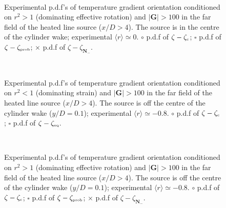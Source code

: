 \documentclass[doublespacing]{elsart}
\begin{document}
\newpage

\begin{figure}[htpb]
\begin{center}
\\
\caption{\label{fig8}
Experimental
p.d.f's of temperature gradient orientation
conditioned on $ r^2 > 1 $ (dominating effective rotation)
and $ |\bm{G}| > 100 $ in the far field of
the heated line source ($ x/D > 4 $).
The
source is in the centre of the cylinder wake;
experimental $ \langle r \rangle \simeq 0 $.
$ \circ $ p.d.f of $ \zeta - \zeta_{\mbox{\tiny c}} $;
$ \square $ p.d.f of $ \zeta - \zeta_{\mbox{\tiny prob}} $;
$ \times $ p.d.f of $ \zeta - \zeta_{\bm{N}_-} $.} 
\end{center}
\end{figure}

\newpage

\begin{figure}[htpb]
\begin{center}
\\
\caption{\label{fig9}
Experimental
p.d.f's of temperature gradient orientation
conditioned on $ r^2 < 1 $ (dominating strain)
and $ |\bm{G}| > 100 $ in the far field of
the heated line source ($ x/D > 4 $).
The
source is off the centre of the cylinder wake
($ y/D = 0.1 $);
experimental $ \langle r \rangle \simeq -0.8 $.
$ \circ $ p.d.f of $ \zeta - \zeta_{\mbox{\tiny c}} $;
$ \square $ p.d.f of $ \zeta - \zeta_{\mbox{\tiny eq}} $.}
\end{center}
\end{figure}

\newpage

\begin{figure}[htpb]
\begin{center}
\\
\caption{\label{fig10}
Experimental
p.d.f's of temperature gradient orientation
conditioned on $ r^2 > 1 $ (dominating effective rotation)
and $ |\bm{G}| > 100 $ in the far field of
the heated line source ($ x/D > 4 $).
The
source is off the centre of the cylinder wake
($ y/D = 0.1 $);
experimental $ \langle r \rangle \simeq -0.8 $.
$ \circ $ p.d.f of $ \zeta - \zeta_{\mbox{\tiny c}} $;
$ \square $ p.d.f of $ \zeta - \zeta_{\mbox{\tiny prob}} $;
$ \times $ p.d.f of $ \zeta - \zeta_{\bm{N}_-} $.} 
\end{center}
\end{figure}
\end{document}
